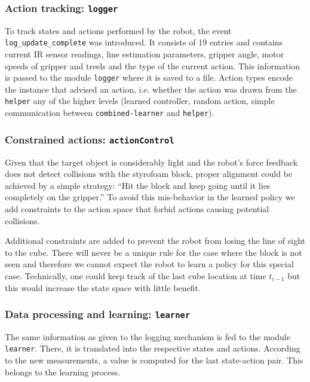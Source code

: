 
\subsubsection{Action tracking: \texttt{logger}}
To track states and actions performed by the robot, the event \texttt{log\_update\_complete} was introduced. It consists of 19 entries and contains current IR sensor readings, line estimation parameters, gripper angle, motor speeds of gripper and treels and the type of the current action. This information is passed to the module \texttt{logger} where it is saved to a file. Action types encode the instance that advised an action, i.e. whether the action was drawn from the \texttt{helper} any of the higher levels (learned controller, random action, simple communication between \texttt{combined-learner} and \texttt{helper}).

\subsubsection{Constrained actions: \texttt{actionControl}}
Given that the target object is considerably light and the robot's force feedback does not detect collisions with the styrofoam block, proper alignment could be achieved by a simple strategy: ``Hit the block and keep going until it lies completely on the gripper.'' To avoid this mis-behavior in the learned policy we add constraints to the action space that forbid actions causing potential collisions.

Additional constraints are added to prevent the robot from losing the line of sight to the cube. There will never be a unique rule for the case where the block is not seen and therefore we cannot expect the robot to learn a policy for this special case. Technically, one could keep track of the last cube location at time $t_{i-1}$ but this would increase the state space with little benefit.

\subsubsection{Data processing and learning: \texttt{learner}}
The same information as given to the logging mechanism is fed to the module \texttt{learner}. There, it is translated into the respective states and actions. According to the new measurements, a value is computed for the last state-action pair. This belongs to the learning process.

